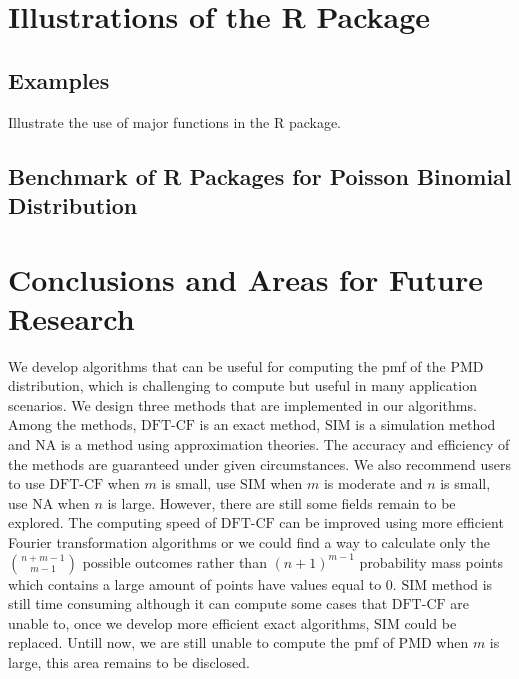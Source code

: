 \documentclass[12pt]{article}
\newcommand{\PMD}{\textrm{PMD}}
\newcommand{\SIM}{{\textrm{SIM}}}
\newcommand{\NA}{{\textrm{NA}}}
\newcommand{\dft}{{\textrm{DFT-CF}}}
\begin{document}
\section{Illustrations of the R Package}
\subsection{Examples}
Illustrate the use of major functions in the R package.


\subsection{Benchmark of R Packages for Poisson Binomial Distribution}



\section{Conclusions and Areas for Future Research}

We develop algorithms that can be useful for computing the pmf of the PMD distribution, which is challenging to compute but useful in many application scenarios. We design three methods that are implemented in our algorithms. Among the methods, $\dft$ is an exact method, $\SIM$ is a simulation method and $\NA$ is a method using approximation theories. The accuracy and efficiency of the methods are guaranteed under given circumstances. We also recommend users to use $\dft$ when $m$ is small, use $\SIM$ when $m$ is moderate and $n$ is small, use $\NA$ when $n$ is large. However, there are still some fields remain to be explored. The computing speed of $\dft$ can be improved using more efficient Fourier transformation algorithms or we could find a way to calculate only the $\binom{n+m-1}{m-1}$ possible outcomes rather than $(n+1)^{m-1}$ probability mass points which contains a large amount of points have values equal to 0. $\SIM$ method is still time consuming although it can compute some cases that $\dft$ are unable to, once we develop more efficient exact algorithms, $\SIM$ could be replaced. Untill now, we are still unable to compute the pmf of $\PMD$ when $m$ is large, this area remains to be disclosed.
\end{document}

